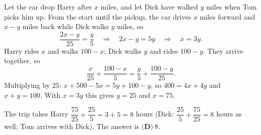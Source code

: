 Let the car drop Harry after $x$ miles, and let Dick have walked $y$ miles when Tom picks him up. From the start until the pickup, the car drives $x$ miles forward and $x-y$ miles back while Dick walks $y$ miles, so
\[\dfrac{2x-y}{25}=\dfrac{y}{5}\quad\Longrightarrow\quad 2x-y=5y\quad\Longrightarrow\quad x=3y .\]
Harry rides $x$ and walks $100-x$; Dick walks $y$ and rides $100-y$. They arrive together, so
\[\dfrac{x}{25}+\dfrac{100-x}{5}=\dfrac {y}{5}+\dfrac{100-y}{25}.\]
Multiplying by $25$: $x+500-5x=5y+100-y$, so $400=4x+4y$ and $x+y=100$. With $x=3y$ this gives $y=25$ and $x=75$.

The trip takes Harry $\dfrac{75}{25}+\dfrac{25}{5}=3+5=8$ hours (Dick: $\dfrac{25}{5}+\dfrac{75}{25}=8$ hours as well; Tom arrives with Dick). The answer is $\boxed{\textbf{(D)}\ 8}$.
